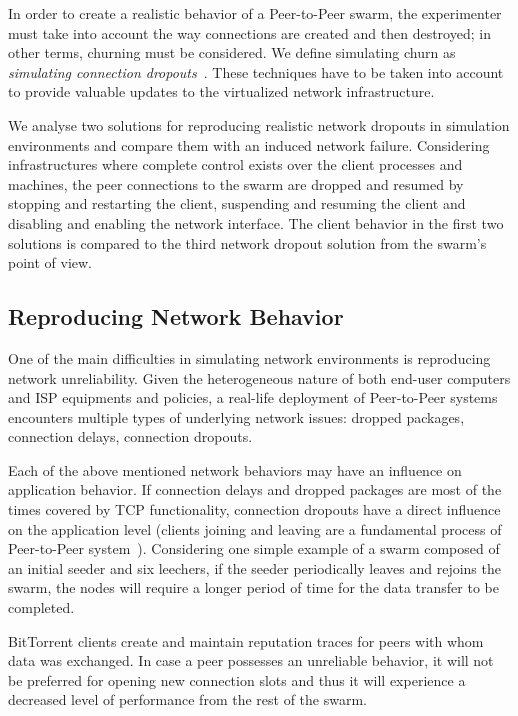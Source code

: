 In order to create a realistic behavior of a Peer-to-Peer swarm, the
experimenter must take into account the way connections are created and then
destroyed; in other terms, churning must be considered. We define simulating
churn as \textit{simulating connection dropouts}~\cite{simulating-dropouts}.
These techniques have to be taken into account to provide valuable updates to
the virtualized network infrastructure.

We analyse two solutions for reproducing realistic network
dropouts in simulation environments and compare them with an induced network
failure. Considering infrastructures where complete control exists over the
client processes and machines, the peer connections to the swarm are dropped
and resumed by stopping and restarting the client, suspending and resuming the
client and disabling and enabling the network interface. The client behavior
in the first two solutions is compared to the third network dropout solution
from the swarm's point of view.

\subsection{Reproducing Network Behavior}
\label{subsec:virt-infra:behavior}

One of the main difficulties in simulating network environments is reproducing
network unreliability. Given the heterogeneous nature of both end-user
computers and ISP equipments and policies, a real-life deployment of
Peer-to-Peer systems encounters multiple types of underlying network issues:
dropped packages, connection delays, connection dropouts.

Each of the above mentioned network behaviors may have an influence on
application behavior. If connection delays and dropped packages are most of
the times covered by TCP functionality, connection dropouts have a direct
influence on the application level (clients joining and leaving are a
fundamental process of Peer-to-Peer system~\cite{p2p-file-sharing-workload}).
Considering one simple example of a swarm composed of an initial seeder and
six leechers, if the seeder periodically leaves and rejoins the swarm, the
nodes will require a longer period of time for the data transfer to be
completed.

BitTorrent clients create and maintain reputation traces for peers with
whom data was exchanged. In case a peer possesses an unreliable behavior, it
will not be preferred for opening new connection slots and thus it will
experience a decreased level of performance from the rest of the swarm.

